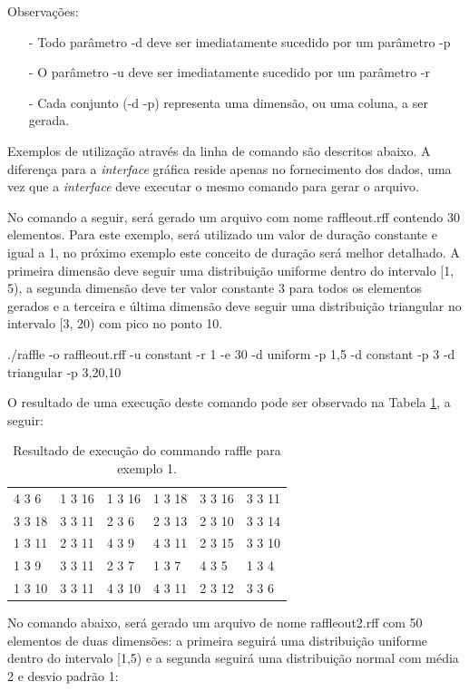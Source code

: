 Observações:
\begin{itemize}
    \item[-] Todo parâmetro -d deve ser imediatamente sucedido por um parâmetro -p
    \item[-] O parâmetro -u deve ser imediatamente sucedido por um parâmetro -r
    \item[-] Cada conjunto (-d -p) representa uma dimensão, ou uma coluna, a ser gerada.
\end{itemize}

Exemplos de utilização através da linha de comando são descritos abaixo. A diferença para a \emph{interface} gráfica reside apenas no fornecimento dos dados, uma vez que a \emph{interface} deve executar o mesmo comando para gerar o arquivo.

No comando a seguir, será gerado um arquivo com nome raffleout.rff contendo 30 elementos. Para este exemplo, será utilizado um valor de duração constante e igual a 1, no próximo exemplo este conceito de duração será melhor detalhado. A primeira dimensão deve seguir uma distribuição uniforme dentro do intervalo [1, 5), a segunda dimensão deve ter valor constante 3 para todos os elementos gerados e a terceira e última dimensão deve seguir uma distribuição triangular no intervalo [3, 20) com pico no ponto 10.

./raffle -o raffleout.rff -u constant -r 1 -e 30 -d uniform -p 1,5 -d constant -p 3 -d triangular -p 3,20,10

O resultado de uma execução deste comando pode ser observado na Tabela \ref{tab:raffleresult1}, a seguir:

\begin{table}[!h]
	\centering
	\caption{Resultado de execução do commando raffle para exemplo 1.}
	\label{tab:raffleresult1}
	\begin{tabular}{|l|l|l|l|l|l|}
		\hline
		4 3 6 & 1 3 16 & 1 3 16 & 1 3 18 & 3 3 16 & 3 3 11 \\
		3 3 18 & 3 3 11 & 2 3 6 & 2 3 13 & 2 3 10 & 3 3 14 \\
		1 3 11 & 2 3 11 & 4 3 9 & 4 3 11 & 2 3 15 & 3 3 10 \\
		1 3 9 & 3 3 11 & 2 3 7 & 1 3 7 & 4 3 5 & 1 3 4 \\
		1 3 10 & 3 3 11 & 4 3 10 & 4 3 11 & 2 3 12 & 3 3 6 \\
		\hline
	\end{tabular}
\end{table}

No comando abaixo, será gerado um arquivo de nome raffleout2.rff com 50 elementos de duas dimensões: a primeira seguirá uma distribuição uniforme dentro do intervalo [1,5) e a segunda seguirá uma distribuição normal com média 2 e desvio padrão 1:

